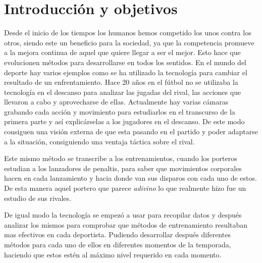 \chapter{Introducción y objetivos}
\label{cap: Introducción y objetivos}

Desde el inicio de los tiempos los humanos hemos competido los unos contra los otros,
siendo este un beneficio para la sociedad, ya que la competencia promueve a la mejora
continua de aquel que quiere llegar a ser el mejor. Esto hace que evolucionen métodos
para desarrollarse en todos los sentidos. En el mundo del deporte hay varios ejemplos
como se ha utilizado la tecnología para cambiar el resultado de un enfrentamiento.
Hace 20 años en el fútbol no se utilizaba la tecnología en el descanso para analizar
las jugadas del rival, las acciones que llevaron a cabo y aprovecharse de ellas.
Actualmente hay varias cámaras grabando cada acción y movimiento para estudiarlos
en el transcurso de la primera parte y así explicárselas a los jugadores en el descanso.
De este modo consiguen una visión externa de que esta pasando en el partido y
poder adaptarse a la situación, consiguiendo una ventaja táctica sobre el rival.

Este mismo método se transcribe a los entrenamientos, cuando los porteros estudian
a los lanzadores de penaltis, para saber que movimientos corporales hacen en cada
lanzamiento y hacia donde van sus disparos con cada uno de estos. De esta manera
aquel portero que parece \textit{adivino} lo que realmente hizo fue un estudio
de sus rivales.

De igual modo la tecnología se empezó a usar para recopilar datos y después analizar
los mismos para comprobar que métodos de entrenamiento resultaban mas efectivos
en cada deportista. Pudiendo desarrollar después diferentes métodos para cada
uno de ellos en diferentes momentos de la temporada, haciendo que estos estén
al máximo nivel requerido en cada momento.

